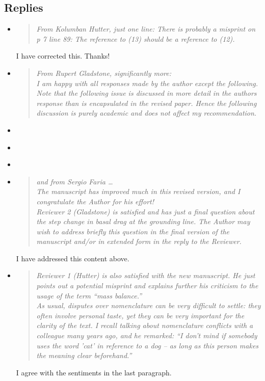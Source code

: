 \documentclass[11pt,reqno]{amsart}
\newcommand{\reply}[2]{
\medskip\medskip
\item  \begin{quote}
\emph{#1}
\end{quote}

\medskip
\noindent #2}
\begin{document}
\subsection*{Replies}  \begin{itemize}
\reply{From Kolumban Hutter, just one line: There is probably a misprint on p 7 line 89: The reference to (13) should be a reference to (12).}{I have corrected this.  Thanks!}

\label{gl}
\reply{From Rupert Gladstone, significantly more: \medskip \\
I am happy with all responses made by the author except the following. Note that the following issue is discussed in more detail in the authors response than is encapsulated in the revised paper. Hence the following discussion is purely academic and does not affect my recommendation.}{}

\reply{}{}

\reply{}{}

\reply{}{}

\reply{and from Sergio Faria \dots \medskip \\
The manuscript has improved much in this revised version, and I congratulate the Author for his effort!
\medskip \\
Reviewer 2 (Gladstone) is satisfied and has just a final question about the step change in basal drag at the grounding line. The Author may wish to address briefly this question in the final version of the manuscript and/or in extended form in the reply to the Reviewer.}
{I have addressed this content above.}

\label{mb}
\reply{Reviewer 1 (Hutter) is also satisfied with the new manuscript. He just points out a potential misprint and explains further his criticism to the usage of the term ``mass balance.''
\medskip \\
As usual, disputes over nomenclature can be very difficult to settle: they often involve personal taste, yet they can be very important for the clarity of the text.  I recall talking about nomenclature conflicts with a colleague many years ago, and he remarked: ``I don't mind if somebody uses the word 'cat' in reference to a dog -- as long as this person makes the meaning clear beforehand.''}
{I agree with the sentiments in the last paragraph.}


\end{itemize}
\end{document}
